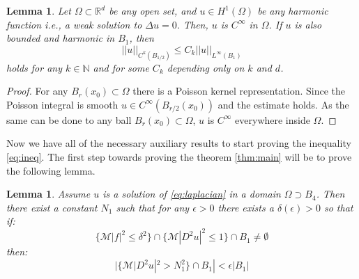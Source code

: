 \documentclass[12pt]{artikel1}
\newtheorem{lemma}[theorem]{Lemma}
\begin{document}
\begin{lemma}\label{lemma:int-reg}
    Let $\Omega\subset\mathbb{R}^d$ be any open set, and $u\in H^1(\Omega)$ be any harmonic function i.e., a weak solution to $\Delta u=0$. Then, $u$ is $C^\infty$ in $\Omega$. If $u$ is also bounded and harmonic in $B_1$, then
    \begin{equation*}
        ||u||_{C^k(B_{1/2})}\leq C_k||u||_{L^\infty(B_1)}
    \end{equation*}
    holds for any $k\in\mathbb{N}$ and for some $C_k$ depending only on $k$ and $d$.
\end{lemma}
\begin{proof}
    For any $B_r(x_0)\subset\Omega$ there is a Poisson kernel representation. Since the Poisson integral is smooth $u\in C^\infty(B_{r/2}(x_0))$ and the estimate holds. As the same can be done to any ball $B_r(x_0)\subset\Omega$, $u$ is $C^\infty$ everywhere inside $\Omega$.
\end{proof}

Now we have all of the necessary auxiliary results to start proving the inequality \ref{eq:ineq}. The first step towards proving the theorem \ref{thm:main} will be to prove the following lemma.

\begin{lemma}\label{lemma:first-main}
    Assume $u$ is a solution of \ref{eq:laplacian} in a domain $\Omega\supset B_4$. Then there exist a constant $N_1$ such that for any $\epsilon>0$ there exists a $\delta(\epsilon)>0$ so that if:
    \begin{equation}\label{eq:lemma55eq1}
        \{\mathcal{M}|f|^2\leq\delta^2\}\cap\{\mathcal{M}|D^2u|^2\leq1\}\cap B_1\neq\emptyset
    \end{equation}
    then:
    \begin{equation}\label{eq:lemma55eq2}
        |\{\mathcal{M}|D^2u|^2>N_1^2\}\cap B_1|<\epsilon|B_1|
    \end{equation}
\end{lemma}
\end{document}
